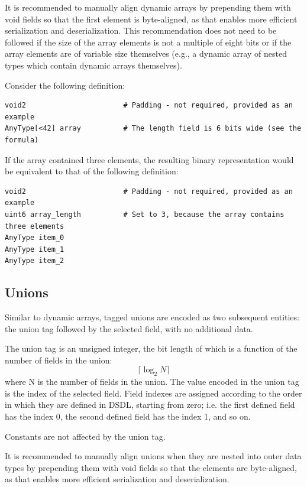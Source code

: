 It is recommended to manually align dynamic arrays by prepending them with void fields
so that the first element is byte-aligned, as that enables more efficient serialization and
deserialization.
This recommendation does not need to be followed if the size of the array elements is not
a multiple of eight bits or if the array elements are of variable size themselves
(e.g., a dynamic array of nested types which contain dynamic arrays themselves).

Consider the following definition:

\begin{verbatim}
void2                       # Padding - not required, provided as an example
AnyType[<42] array          # The length field is 6 bits wide (see the formula)
\end{verbatim}

If the array contained three elements,
the resulting binary representation would be equivalent to that of the following definition:

\begin{verbatim}
void2                       # Padding - not required, provided as an example
uint6 array_length          # Set to 3, because the array contains three elements
AnyType item_0
AnyType item_1
AnyType item_2
\end{verbatim}

\subsection{Unions}

Similar to dynamic arrays, tagged unions are encoded as two subsequent entities:
the union tag followed by the selected field, with no additional data.

The union tag is an unsigned integer, the bit length of which is a function of the number of fields in the union:
$$\lceil{}\log_2 N\rceil{}$$
where N is the number of fields in the union.
The value encoded in the union tag is the index of the selected field.
Field indexes are assigned according to the order in which they are defined in DSDL,
starting from zero;
i.e. the first defined field has the index 0, the second defined field has the index 1, and so on.

Constants are not affected by the union tag.

It is recommended to manually align unions when they are nested into outer data types by
prepending them with void fields so that the elements are byte-aligned,
as that enables more efficient serialization and deserialization.

